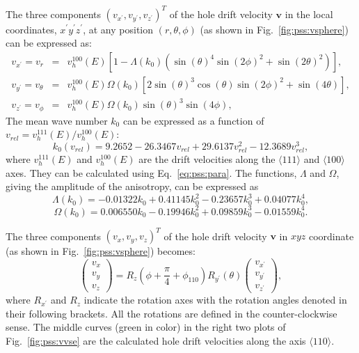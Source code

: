 The three components $(v_{x^{\prime}}, v_{y^{\prime}}, v_{z^{\prime}})^{T}$ of the hole drift velocity $\mathbf{v}$ in the local coordinates, $x^{\prime}y^{\prime}z^{\prime}$, at any position $(r, \theta, \phi)$ (as shown in Fig.~\ref{fig:pss:vsphere}) can be expressed as:
\begin{equation}
\label{eq:pss:vsphere}
\begin{array}{rcl}
v_{x^{\prime}} = v_{r} &=& v^{100}_{h}(E)[1-\Lambda(k_{0})(\sin(\theta)^{4}\sin(2\phi)^{2} + \sin(2\theta)^{2})],\\
v_{y^{\prime}} = v_{\theta} &=& v^{100}_{h}(E)\Omega(k_{0})[2\sin(\theta)^{3}\cos(\theta)\sin(2\phi)^{2} + \sin(4\theta)],\\
v_{z^{\prime}} = v_{\phi} &=& v^{100}_{h}(E)\Omega(k_{0})\sin(\theta)^{3}\sin(4\phi),
\end{array}
\end{equation}
The mean wave number $k_{0}$ can be expressed as a function of $v_{rel} = v^{111}_{h}(E)/v^{100}_{h}(E)$:
\begin{equation}
\label{eq:pss:k0}
k_{0}(v_{rel}) = 9.2652 - 26.3467v_{rel} + 29.6137v_{rel}^{2} - 12.3689v_{rel}^{3},
\end{equation}
where $v^{111}_{h}(E)$ and $v^{100}_{h}(E)$ are the drift velocities along the $\langle111\rangle$ and $\langle100\rangle$ axes. They can be calculated using Eq.~\ref{eq:pss:para}. The functions, $\Lambda$ and $\Omega$, giving the amplitude of the anisotropy, can be expressed as
\begin{equation}
\label{eq:pss:lamb}
\Lambda(k_{0}) = -0.01322k_{0} + 0.41145k_{0}^{2} - 0.23657k_{0}^{3} + 0.04077k_{0}^{4},
\end{equation}
\begin{equation}
\label{eq:pss:ome}
\Omega(k_{0}) = 0.006550k_{0} - 0.19946k_{0}^{2} + 0.09859k_{0}^{3} - 0.01559k_{0}^{4}.
\end{equation}

The three components $(v_{x}, v_{y}, v_{z})^{T}$ of the hole drift velocity $\mathbf{v}$ in $xyz$ coordinate (as shown in Fig.~\ref{fig:pss:vsphere}) becomes:
\begin{equation}
\label{eq:pss:v2v}  
\left(
\begin{array}{c}
v_{x} \\ v_{y} \\ v_{z}
\end{array}
\right) = R_{z}(\phi + \frac{\pi}{4} + \phi_{110}) R_{y^{\prime}}(\theta) \left( 
\begin{array}{c}
v_{x^{\prime}} \\ v_{y^{\prime}} \\ v_{z^{\prime}}
\end{array} \right),
\end{equation}
where $R_{x^{\prime}}$ and $R_{z}$ indicate the rotation axes with the rotation angles denoted in their following brackets. All the rotations are defined in the counter-clockwise sense. The middle curves (green in color) in the right two plots of Fig.~\ref{fig:pss:vvse} are the calculated hole drift velocities along the axis $\langle 110 \rangle$.


